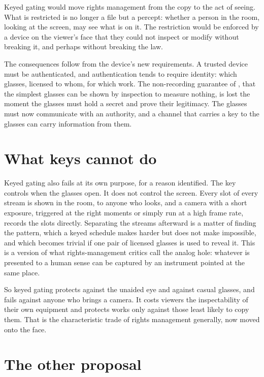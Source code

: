 Keyed gating would move rights management from the copy to the act of seeing. What is restricted is no longer a file but a percept: whether a person in the room, looking at the screen, may see what is on it. The restriction would be enforced by a device on the viewer's face that they could not inspect or modify without breaking it, and perhaps without breaking the law.

The consequences follow from the device's new requirements. A trusted device must be authenticated, and authentication tends to require identity: which glasses, licensed to whom, for which work. The non-recording guarantee of , that the simplest glasses can be shown by inspection to measure nothing, is lost the moment the glasses must hold a secret and prove their legitimacy. The glasses must now communicate with an authority, and a channel that carries a key to the glasses can carry information from them.

\section{What keys cannot do}

Keyed gating also fails at its own purpose, for a reason  identified. The key controls when the glasses open. It does not control the screen. Every slot of every stream is shown in the room, to anyone who looks, and a camera with a short exposure, triggered at the right moments or simply run at a high frame rate, records the slots directly. Separating the streams afterward is a matter of finding the pattern, which a keyed schedule makes harder but does not make impossible, and which becomes trivial if one pair of licensed glasses is used to reveal it. This is a version of what rights-management critics call the analog hole: whatever is presented to a human sense can be captured by an instrument pointed at the same place.

So keyed gating protects against the unaided eye and against casual glasses, and fails against anyone who brings a camera. It costs viewers the inspectability of their own equipment and protects works only against those least likely to copy them. That is the characteristic trade of rights management generally, now moved onto the face.

\section{The other proposal}

